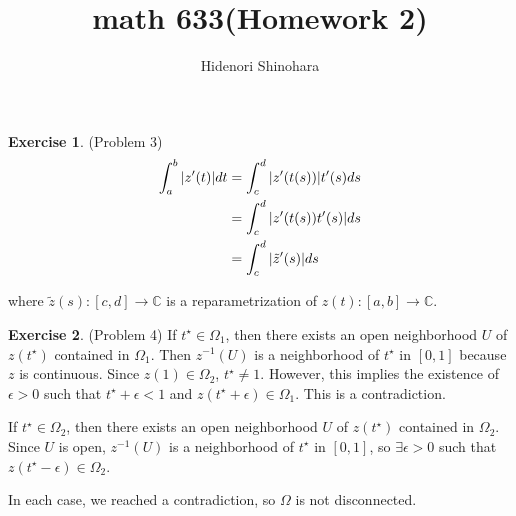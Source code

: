 \documentclass[12pt, psamsfonts]{amsart}
\theoremstyle{definition}
\newtheorem*{exer}{Exercise}
\theoremstyle{remark}
\numberwithin{equation}{section}
\begin{document}
\title{math 633(Homework 2)}
\author{Hidenori Shinohara}
\maketitle

\begin{exer}{(Problem 3)}
  \begin{align*}
    \int_a^b \abs{z'(t)} dt
      &= \int_c^d \abs{z'(t(s))}t'(s) ds \\
      &= \int_c^d \abs{z'(t(s))t'(s)} ds \\
      &= \int_c^d \abs{\tilde{z}'(s)} ds
  \end{align*}
  
  where $\tilde{z}(s): [c, d] \rightarrow \mathbb{C}$ is a reparametrization of $z(t): [a, b] \rightarrow \mathbb{C}$.
\end{exer}

\begin{exer}{(Problem 4)}
  If $t^{\star} \in \Omega_1$, then there exists an open neighborhood $U$ of $z(t^{\star})$ contained in $\Omega_1$.
  Then $z^{-1}(U)$ is a neighborhood of $t^{\star}$ in $[0, 1]$ because $z$ is continuous.
  Since $z(1) \in \Omega_2$, $t^{\star} \ne 1$.
  However, this implies the existence of $\epsilon > 0$ such that $t^{\star} + \epsilon < 1$ and $z(t^{\star} + \epsilon) \in \Omega_1$.
  This is a contradiction.

  If $t^{\star} \in \Omega_2$, then there exists an open neighborhood $U$ of $z(t^{\star})$ contained in $\Omega_2$.
  Since $U$ is open, $z^{-1}(U)$ is a neighborhood of $t^{\star}$ in $[0, 1]$, so $\exists \epsilon > 0$ such that $z(t^{\star} - \epsilon) \in \Omega_2$.

  In each case, we reached a contradiction, so $\Omega$ is not disconnected.
\end{exer}
\end{document}
